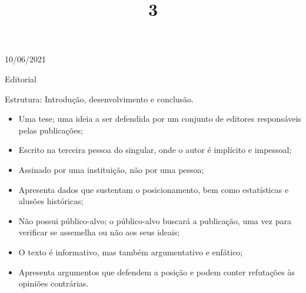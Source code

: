 \documentclass{SchoolBook}
\begin{document}
    \begin{day}{10/06/2021}
        \title{3}{Editorial}
        
        Estrutura: Introdução, desenvolvimento e conclusão.
        
        \begin{itemize}[nosep]
            \item Uma tese; uma ideia a ser defendida por um conjunto de editores responsáveis pelas publicações;
            \item Escrito na terceira pessoa do singular, onde o autor é implícito e impessoal;
            \item Assinado por uma instituição, não por uma pessoa;
            \item Apresenta dados que sustentam o posicionamento, bem como estatísticas e alusões históricas;
            \vspace{6pt}
            \item Não possui público-alvo; o público-alvo buscará a publicação, uma vez para verificar se assemelha ou não aos seus ideais;
            \item O texto é informativo, mas também argumentativo e enfático;
            \item Apresenta argumentos que defendem a posição e podem conter refutações às opiniões contrárias.
        \end{itemize}
    \end{day}
    
\end{document}
